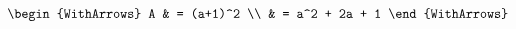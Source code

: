 \documentclass[varwidth]{standalone}
\begin{document}
$\begin{WithArrows}
A & = (a+1)^2 \\
  & = a^2 + 2a + 1
\end{WithArrows}$
\end{document}
